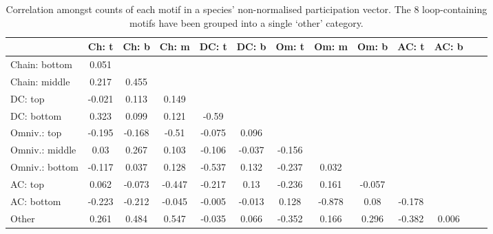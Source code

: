 \documentclass[12pt]{article}
\begin{document}
\begin{spacing}{2.0}
		\begin{table}[h!]
    		\caption{Correlation amongst counts of each motif in a species' non-normalised participation vector. The 8 loop-containing motifs have been grouped into a single `other' category.}
    		\label{tab:position_count_correlations}
    		\footnotesize
    		\begin{tabular}{l | c c c c c c c c c c c c}    
        		&	Ch: t	&	Ch: b	&	Ch: m	&	DC: t	&	DC: b	&	Om: t	&	Om: m	&	Om: b	&	AC: t	&	AC: b	\\
                \hline
                Chain: bottom	&	0.051	&		&		&		&		&		&		&		&		&		\\
                Chain: middle	&	0.217	&	0.455	&		&		&		&		&		&		&		&		\\
                DC: top	&	-0.021	&	0.113	&	0.149	&		&		&		&		&		&		&		\\
                DC: bottom	&	0.323	&	0.099	&	0.121	&	-0.59	&		&		&		&		&		&		\\
                Omniv.: top	&	-0.195	&	-0.168	&	-0.51	&	-0.075	&	0.096	&		&		&		&		&		\\
                Omniv.: middle	&	0.03	&	0.267	&	0.103	&	-0.106	&	-0.037	&	-0.156	&		&		&		&		\\
                Omniv.: bottom	&	-0.117	&	0.037	&	0.128	&	-0.537	&	0.132	&	-0.237	&	0.032	&		&		&		\\
                AC: top	&	0.062	&	-0.073	&	-0.447	&	-0.217	&	0.13	&	-0.236	&	0.161	&	-0.057	&		&		\\
                AC: bottom	&	-0.223	&	-0.212	&	-0.045	&	-0.005	&	-0.013	&	0.128	&	-0.878	&	0.08	&	-0.178	&		\\
                Other	&	0.261	&	0.484	&	0.547	&	-0.035	&	0.066	&	-0.352	&	0.166	&	0.296	&	-0.382	&	0.006	\\
                \hline
            \end{tabular}
            \end{table}
            


\end{spacing}
\end{document}

